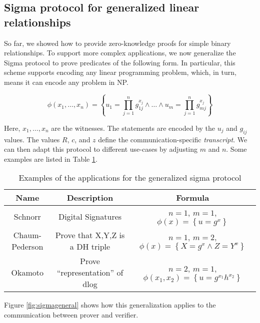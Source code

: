 \subsection{Sigma protocol for generalized linear relationships}

So far, we showed how to provide zero-knowledge proofs for simple binary relationships.
To support more complex applications, we now generalize the Sigma protocol to prove predicates of the following form.
In particular, this scheme supports encoding any linear programming problem, which, in turn, means it can encode any problem in NP.

\begin{equation*}
    \phi(x_1, \dots, x_n) = \left\{ u_1 = \prod_{j=1}^{n} g_{1j}^{x_j} \land \dots \land u_m  = \prod_{j=1}^{n} g_{mj}^{x_j}\right\}
\end{equation*}

Here, $x_1, \dots, x_n$ are the witnesses. The statements are encoded by the $u_j$ and $g_{ij}$ values.
The values $R$, $c$, and $z$ define the communication-specific \emph{transcript}.
We can then adapt this protocol to different use-cases by adjusting $m$ and $n$. Some examples are listed in Table \ref{tab:sigmaexamples}.

\begin{table}[h]
\begin{tabular}{|c|c|c|}
\hline
    \textbf{Name} & \textbf{Description} & \textbf{Formula} \\
\hline
    Schnorr        & Digital Signatures & $n=1$, $m=1$, $\phi(x) = \left\{ u = g^x \right\}$ \\
    Chaum-Pederson & Prove that X,Y,Z is a DH triple &  $n=1$, $m=2$, $\phi(x) = \left\{ X = g^x \land Z = Y^x\right\}$ \\
    Okamoto        & Prove ``representation'' of dlog &  $n=2$, $m=1$, $\phi(x_1, x_2) = \left\{ u = g^{x_1} h^{x_2} \right\} $ \\
\hline
\end{tabular}

\caption{Examples of the applications for the generalized sigma protocol}
\label{tab:sigmaexamples}
\end{table}

Figure \ref{fig:sigmageneral} shows how this generalization applies to the communication between prover and verifier.


